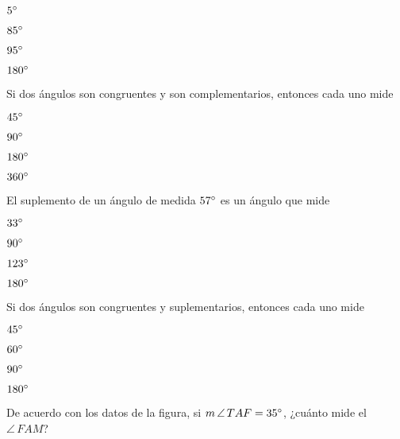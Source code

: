 \documentclass[12pt, fleqn]{article}
\begin{document}
\benu
\item[] \opc $5^\circ$\vf
\item[] \opc $85^\circ$\vf
\item[] \opc $95^\circ$\vf
\item[] \opc $180^\circ$
\eenu
\vs

\item Si dos ángulos son congruentes y son complementarios, entonces cada uno mide \vp

\benu
\item[] \opc $45^\circ$ \vf
\item[] \opc $90^\circ$ \vf
\item[] \opc $180^\circ$ \vf
\item[] \opc $360^\circ$
\eenu\vs

\item El suplemento de un ángulo de medida $57^\circ$ es un ángulo que mide \vp

\benu
\item[] \opc $33^\circ$ \vf
\item[] \opc $90^\circ$ \vf
\item[] \opc $123^\circ$ \vf
\item[] \opc $180^\circ$
\eenu\vs

\item Si dos ángulos son congruentes y suplementarios, entonces cada uno mide \vp

\benu
\item[] \opc $45^\circ$ \vf
\item[] \opc $60^\circ$ \vf
\item[] \opc $90^\circ$ \vf
\item[] \opc $180^\circ$
\eenu

\pagebreak

\item De acuerdo con los datos de la figura, si $m\,\angle\,TAF=35^\circ$, ¿cuánto mide el $\angle\,FAM$? \vs\vs
\end{document}
